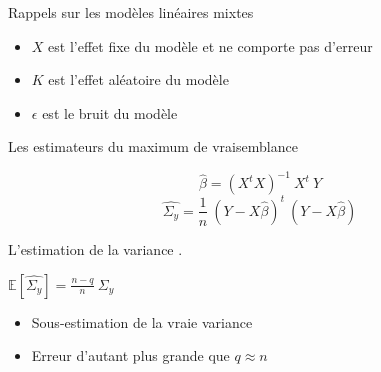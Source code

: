 \documentclass[unknownkeysallowed]{beamer}
\begin{document}
\begin{frame}{Rappels sur les modèles linéaires mixtes}


\vspace{0.25cm}

\begin{itemize}
	\item $X$ est l'effet fixe du modèle et ne comporte pas d'erreur
	\item $K$ est l'effet aléatoire du modèle
	\item $\epsilon$ est le bruit du modèle 
\end{itemize}



    
\end{frame}

\begin{frame}{Les estimateurs du maximum de vraisemblance}

\vspace{0.4cm}

{

$$\hat{\beta} = (X^t X)^{-1} \ X^{t} \ Y$$ 
$$\hat{\Sigma_y} = \frac{1}{n} \ (Y-X\hat{\beta})^t \ (Y-X\hat{\beta})$$

}


\vspace{0.25cm}

L'estimation de la variance .

\vspace{0.25cm}

$\mathbb{E}[\hat{\Sigma_y}] = \frac{n-q}{n} \ \Sigma_y$ 

\vspace{0.25cm}

\begin{itemize}
	\item Sous-estimation de la vraie variance
	\item Erreur d'autant plus grande que $q \approx n$
\end{itemize}


\end{frame}
\end{document}

